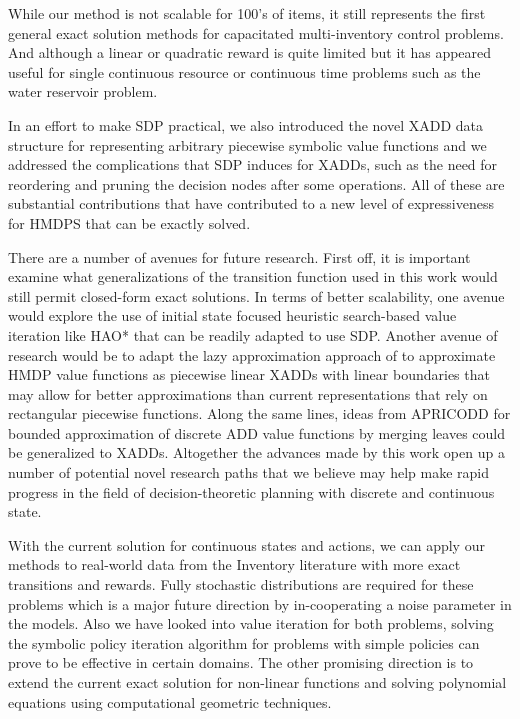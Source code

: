 \documentclass[twoside,11pt]{article}
\begin{document}
While our method is not scalable for 100's of items, it still represents
the first general exact solution methods for capacitated multi-inventory control problems. 
And although a linear or quadratic reward is quite limited but it has appeared useful for single continuous resource or continuous time problems such as the water reservoir problem. 

In an effort to make SDP practical, we also introduced
the novel XADD data structure for representing arbitrary piecewise
symbolic value functions and we addressed the complications that
SDP induces for XADDs, such as the need for reordering and pruning the decision
nodes after some operations.  All of these are substantial contributions
that have contributed to a new level of expressiveness for HMDPS
that can be exactly solved.

There are a number of avenues for future research.  First off, it is
important examine what generalizations of the transition function used
in this work would still permit closed-form exact solutions.  In terms
of better scalability, one avenue would explore the use of initial
state focused heuristic search-based value iteration like
HAO* \cite{hao09} that can be readily adapted to use SDP.  Another
avenue of research would be to adapt the lazy approximation approach
of \cite{li05} to approximate HMDP value functions as piecewise
linear XADDs with linear boundaries that may allow for better
approximations than current representations that rely on rectangular
piecewise functions.  Along the same lines, ideas from
APRICODD \cite{apricodd} for bounded approximation of discrete ADD
value functions by merging leaves could be generalized to XADDs.
Altogether the advances made by this work open up a number of
potential novel research paths that we believe may help make
rapid progress in the field of decision-theoretic planning
with discrete and continuous state.

With the current solution for continuous states and actions, we can apply our methods to real-world data from the Inventory literature with more exact transitions and rewards. Fully stochastic distributions are required for these problems which is a major future direction by in-cooperating a noise parameter in the models. 
Also we have looked into value iteration for both problems, solving the symbolic policy iteration algorithm for problems with simple policies can prove to be effective in certain domains. 
The other promising direction is to extend the current exact solution for non-linear functions and solving polynomial equations using computational geometric techniques. 
\end{document}
